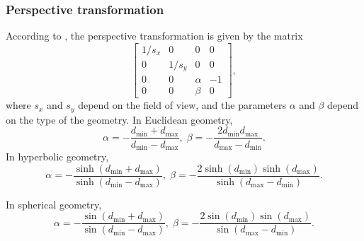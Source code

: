 \subsubsection{Perspective transformation}
According to \cite{Szirmay-Kalos2022}, the perspective transformation is given by the matrix
\begin{equation*}
    \begin{bmatrix}
        1 / s_x & 0       & 0      & 0  \\
        0       & 1 / s_y & 0      & 0  \\
        0       & 0       & \alpha & -1 \\
        0       & 0       & \beta  & 0
    \end{bmatrix},
\end{equation*}
where $s_x$ and $s_y$ depend on the field of view, and the parameters $\alpha$ and $\beta$ depend on the type of the geometry.
In Euclidean geometry,
\begin{equation*}
    \alpha = -\frac{d_\mathrm{min} + d_\mathrm{max}}{d_\mathrm{min} - d_\mathrm{max}}, \;
    \beta = -\frac{2d_\mathrm{min}d_\mathrm{max}}{d_\mathrm{max} - d_\mathrm{min}}.
\end{equation*}
In hyperbolic geometry,
\begin{equation*}
    \alpha = -\frac{\sinh(d_\mathrm{min} + d_\mathrm{max})}{\sinh(d_\mathrm{min} - d_\mathrm{max})}, \;
    \beta = -\frac{2\sinh(d_\mathrm{min}) \sinh(d_\mathrm{max})}{\sinh(d_\mathrm{max} - d_\mathrm{min})}.
\end{equation*}

In spherical geometry,
\begin{equation*}
    \alpha = -\frac{\sin(d_\mathrm{min} + d_\mathrm{max})}{\sin(d_\mathrm{min} - d_\mathrm{max})}, \;
    \beta = -\frac{2\sin(d_\mathrm{min}) \sin(d_\mathrm{max})}{\sin(d_\mathrm{max} - d_\mathrm{min})}.
\end{equation*}

